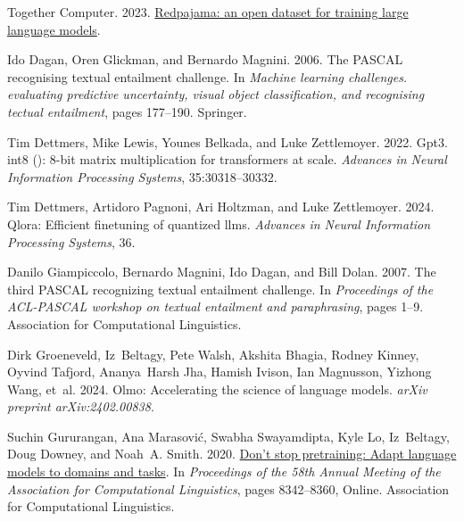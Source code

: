 \documentclass[11pt]{article}
\begin{document}
\begin{thebibliography}{88}
    Together Computer. 2023.
    \newblock \href {https://github.com/togethercomputer/RedPajama-Data} {Redpajama: an open dataset for training large language models}.
    
    Ido Dagan, Oren Glickman, and Bernardo Magnini. 2006.
    \newblock The {PASCAL} recognising textual entailment challenge.
    \newblock In \emph{Machine learning challenges. evaluating predictive uncertainty, visual object classification, and recognising tectual entailment}, pages 177--190. Springer.
    
    Tim Dettmers, Mike Lewis, Younes Belkada, and Luke Zettlemoyer. 2022.
    \newblock Gpt3. int8 (): 8-bit matrix multiplication for transformers at scale.
    \newblock \emph{Advances in Neural Information Processing Systems}, 35:30318--30332.
    
    Tim Dettmers, Artidoro Pagnoni, Ari Holtzman, and Luke Zettlemoyer. 2024.
    \newblock Qlora: Efficient finetuning of quantized llms.
    \newblock \emph{Advances in Neural Information Processing Systems}, 36.
    
    Danilo Giampiccolo, Bernardo Magnini, Ido Dagan, and Bill Dolan. 2007.
    \newblock The third {PASCAL} recognizing textual entailment challenge.
    \newblock In \emph{Proceedings of the ACL-PASCAL workshop on textual entailment and paraphrasing}, pages 1--9. Association for Computational Linguistics.
    
    Dirk Groeneveld, Iz~Beltagy, Pete Walsh, Akshita Bhagia, Rodney Kinney, Oyvind Tafjord, Ananya~Harsh Jha, Hamish Ivison, Ian Magnusson, Yizhong Wang, et~al. 2024.
    \newblock Olmo: Accelerating the science of language models.
    \newblock \emph{arXiv preprint arXiv:2402.00838}.
    
    Suchin Gururangan, Ana Marasovi{\'c}, Swabha Swayamdipta, Kyle Lo, Iz~Beltagy, Doug Downey, and Noah~A. Smith. 2020.
    \newblock \href {https://doi.org/10.18653/v1/2020.acl-main.740} {Don{'}t stop pretraining: Adapt language models to domains and tasks}.
    \newblock In \emph{Proceedings of the 58th Annual Meeting of the Association for Computational Linguistics}, pages 8342--8360, Online. Association for Computational Linguistics.
    

\end{thebibliography}
\end{document}

